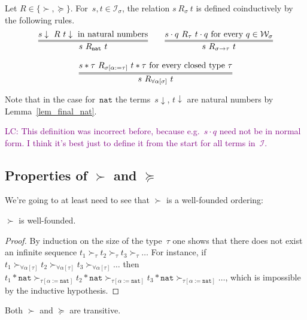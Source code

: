\documentclass[runningheads,a4paper]{llncs}
\newcommand{\Iterms}{\mathcal{I}}
\newcommand{\World}{\mathcal{W}}
\newcommand{\arrtype}{\rightarrow}
\newcommand{\app}[2]{#1 \cdot #2}
\newcommand{\tapp}[2]{#1 * #2}
\newcommand{\subst}[2]{#1:=#2}
\newcommand{\nat}{\mathtt{nat}}
\newcommand{\da}{\downarrow}
\newcommand{\LC}[1]{\textcolor{purple}{LC: #1}}
\begin{document}
\begin{definition}\label{def:succ}
  Let $R \in \{ \succ,\succeq \}$. For~$s,t \in \Iterms_\sigma$, the
  relation $s\ R_{\sigma}\ t$ is defined coinductively by the
  following rules.
  \[
    \begin{array}{c}
    \infer={s\ R_\nat\ t}{s\da\ R\ t\da \text{ in natural
        numbers}}\quad\quad
    \infer={s\ R_{\sigma\arrtype\tau}\ t}{\app{s}{q}\ R_{\tau}\ \app{t}{q}
      \text{ for every } q \in \World_\sigma} \\ \\
    \infer={s\ R_{\forall\alpha[\sigma]}\ t}{\tapp{s}{\tau}\ R_{\sigma[\subst{\alpha}{\tau}]}\ \tapp{t}{\tau}
      \text{ for every closed type } \tau}
    \end{array}
  \]
\end{definition}

Note that in the case for~$\nat$ the terms~$s\da$, $t\da$ are natural
numbers by Lemma~\ref{lem_final_nat}.

\LC{This definition was incorrect before, because e.g.~$\app{s}{q}$
  need not be in normal form. I think it's best just to define it from
  the start for all terms in~$\Iterms$.}

\subsection{Properties of $\succ$ and $\succeq$}

We're going to at least need to see that $\succ$ is a well-founded
ordering:

\begin{lemma}
$\succ$ is well-founded.
\end{lemma}

\begin{proof}
  By induction on the size of the type~$\tau$ one shows that there
  does not exist an infinite sequence $t_1 \succ_\tau t_2 \succ_\tau
  t_3 \succ_\tau \ldots$ For instance, if $t_1
  \succ_{\forall\alpha[\tau]} t_2 \succ_{\forall\alpha[\tau]} t_3
  \succ_{\forall\alpha[\tau]} \ldots$ then $\tapp{t_1}{\nat}
  \succ_{\tau[\subst{\alpha}{\nat}]} \tapp{t_2}{\nat}
  \succ_{\tau[\subst{\alpha}{\nat}]} \tapp{t_3}{\nat}
  \succ_{\tau[\subst{\alpha}{\nat}]} \ldots$, which is impossible by
  the inductive hypothesis.
\end{proof}

\begin{lemma}
Both $\succ$ and $\succeq$ are transitive.
\end{lemma}
\end{document}
